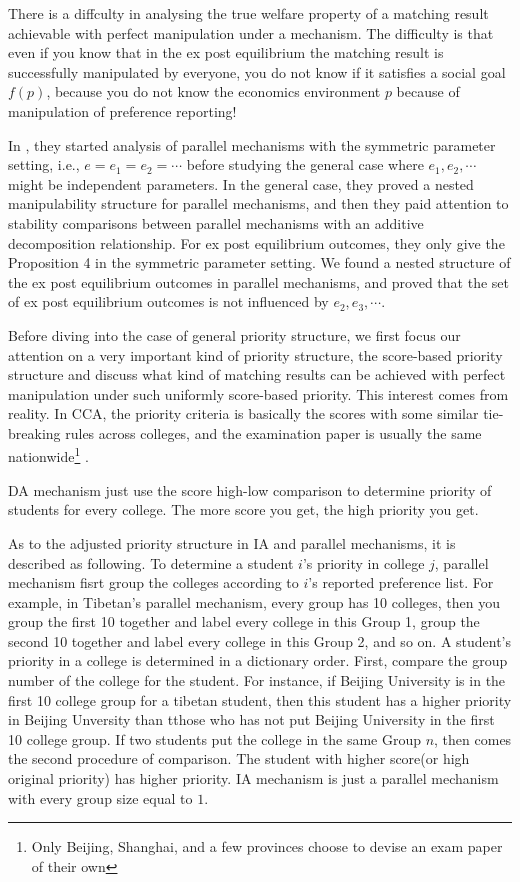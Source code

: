 There is a diffculty in analysing the true welfare property of a matching result achievable with perfect manipulation under a mechanism. The difficulty is that  even if you know that in the ex post equilibrium the matching result
is successfully manipulated by everyone, you do not know if it
satisfies a social goal $f(p)$, because you do not know the economics
environment $p$ because of manipulation of preference reporting!


In \parencite{YanChenJPE}, they started analysis of parallel mechanisms with the symmetric parameter setting, i.e., $e =e_1=e_2=\cdots$ before studying the general case where $e_1, e_2,\cdots$ might be independent parameters. In the general case, they proved a nested manipulability structure for parallel mechanisms, and then they paid attention to stability comparisons between parallel mechanisms with an additive decomposition relationship. For ex post equilibrium outcomes, they only give the Proposition 4 in the symmetric parameter setting. We found a nested structure of the ex post equilibrium outcomes in parallel mechanisms, and proved that the set of ex post equilibrium outcomes is not influenced by $e_2,e_3,\cdots$.   





 Before diving into the case of general priority structure, we first
focus our attention on a very important kind of priority structure,
the score-based priority structure and discuss what kind of matching
results can be achieved with perfect manipulation under such uniformly
score-based priority. This interest comes from reality. In CCA, the priority criteria is basically the scores with some similar tie-breaking rules across colleges, and the examination paper is usually the same nationwide\footnote{Only Beijing, Shanghai, and a few provinces choose to devise an exam paper of their own} .

DA mechanism just use the score high-low comparison to determine
priority of students for every college. The more score you get, the
high priority you get.

As to the adjusted priority structure in IA and parallel mechanisms, it is described as following.
To determine a student $i$'s priority in college $j$, parallel
mechanism fisrt group the colleges according to $i$'s reported
preference list. For example, in Tibetan's parallel mechanism, every
group has 10 colleges, then you group the first 10 together and label
every college in this Group 1, group the second 10 together and label
every college in this Group 2, and so on. A student's priority in a
college is determined in a dictionary order. First, compare the group
number of the college for the student. For instance, if Beijing
University is in the first 10 college group for a tibetan student, 
then this student has a higher priority in Beijing Unversity than
tthose who has not put  Beijing University in the first 10 college
group. If two students put the college in the same Group $n$, then
comes the second procedure of comparison. The student with higher
score(or high original priority) has higher priority. IA mechanism is
just a parallel mechanism with every group size equal to $1$.

